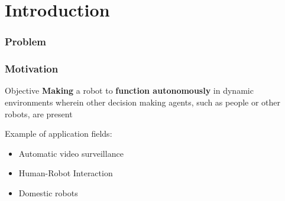 \section{Introduction}

\begin{frame}
	\frametitle{Problem}
	
	\vspace{0.3cm}
	
	\begin{center}
	\end{center}
\end{frame}

\begin{frame}
	\frametitle{Motivation}
	
	\vspace{0.4cm}
	
	\Large
	
	\begin{block}{Objective}
		\textbf{Making} a robot to \textbf{function autonomously} in dynamic environments
		wherein other decision making agents, such as people or other robots, are present
	\end{block}
	
	\vspace{0.3cm}
	
	Example of application fields:
	
	\begin{itemize}
		\item Automatic video surveillance
		\item Human-Robot Interaction
		\item Domestic robots
	\end{itemize}
\end{frame}

